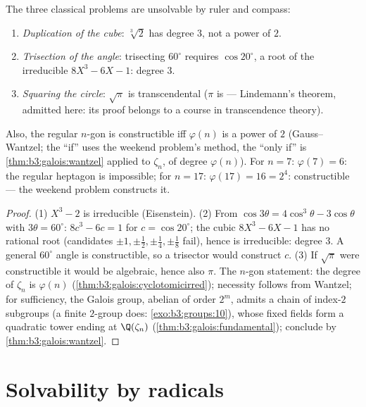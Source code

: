 \begin{corollary}\label{cor:b3:galois:impossible}
The three classical problems are unsolvable by ruler and
compass:
\begin{enumerate}
  \item \emph{Duplication of the cube}: $\sqrt[3]2$ has degree
        $3$, not a power of $2$.
  \item \emph{Trisection of the angle}: trisecting $60^\circ$
        requires $\cos 20^\circ$, a root of the irreducible $8X^3
        - 6X - 1$: degree $3$.
  \item \emph{Squaring the circle}: $\sqrt\pi$ is transcendental
        ($\pi$ is --- Lindemann's theorem, admitted here: its
        proof belongs to a course in transcendence theory).
\end{enumerate}
Also, the regular $n$-gon is constructible iff
$\varphi(n)$ is a power of $2$ (Gauss--Wantzel; the ``if'' uses
the weekend problem's method, the ``only if'' is
\cref{thm:b3:galois:wantzel} applied to $\zeta_n$, of degree
$\varphi(n)$). For $n = 7$: $\varphi(7) = 6$: the regular
heptagon is impossible; for $n = 17$: $\varphi(17) = 16 = 2^4$:
constructible --- the weekend problem constructs it.
\end{corollary}

\begin{proof}
(1) $X^3 - 2$ is irreducible (Eisenstein). (2) From $\cos
3\theta = 4\cos^3\theta - 3\cos\theta$ with $3\theta =
60^\circ$: $8c^3 - 6c = 1$ for $c = \cos 20^\circ$; the cubic
$8X^3 - 6X - 1$ has no rational root (candidates $\pm1, \pm\frac
12, \pm\frac14, \pm\frac18$ fail), hence is irreducible: degree
$3$. A general $60^\circ$ angle is constructible, so a trisector
would construct $c$. (3) If $\sqrt\pi$ were constructible it
would be algebraic, hence also $\pi$. The $n$-gon statement: the
degree of $\zeta_n$ is $\varphi(n)$
(\cref{thm:b3:galois:cyclotomicirred}); necessity follows from
Wantzel; for sufficiency, the Galois group, abelian of order
$2^m$, admits a chain of index-$2$ subgroups (a finite $2$-group
does: \cref{exo:b3:groups:10}), whose fixed fields form a
quadratic tower ending at $\Q(\zeta_n)$
(\cref{thm:b3:galois:fundamental}); conclude by
\cref{thm:b3:galois:wantzel}.
\end{proof}

\section{Solvability by radicals}

